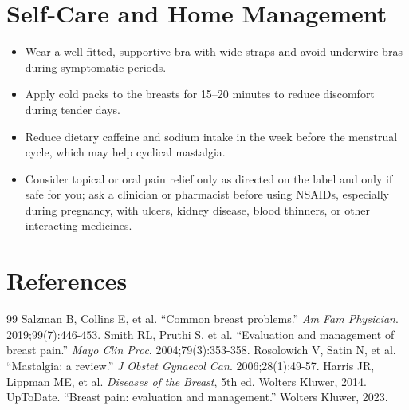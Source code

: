 \section*{Self-Care and Home Management}
\begin{itemize}
 \item Wear a well-fitted, supportive bra with wide straps and avoid underwire bras during symptomatic periods.
 \item Apply cold packs to the breasts for 15–20 minutes to reduce discomfort during tender days.
 \item Reduce dietary caffeine and sodium intake in the week before the menstrual cycle, which may help cyclical mastalgia.
 \item Consider topical or oral pain relief only as directed on the label and only if safe for you; ask a clinician or pharmacist before using NSAIDs, especially during pregnancy, with ulcers, kidney disease, blood thinners, or other interacting medicines.
\end{itemize}

\section*{References}
\begin{thebibliography}{99}
 Salzman B, Collins E, et al. ``Common breast problems.'' \textit{Am Fam Physician}. 2019;99(7):446-453.
 Smith RL, Pruthi S, et al. ``Evaluation and management of breast pain.'' \textit{Mayo Clin Proc}. 2004;79(3):353-358.
 Rosolowich V, Satin N, et al. ``Mastalgia: a review.'' \textit{J Obstet Gynaecol Can}. 2006;28(1):49-57.
 Harris JR, Lippman ME, et al. \textit{Diseases of the Breast}, 5th ed. Wolters Kluwer, 2014.
 UpToDate. ``Breast pain: evaluation and management.'' Wolters Kluwer, 2023.
\end{thebibliography}
